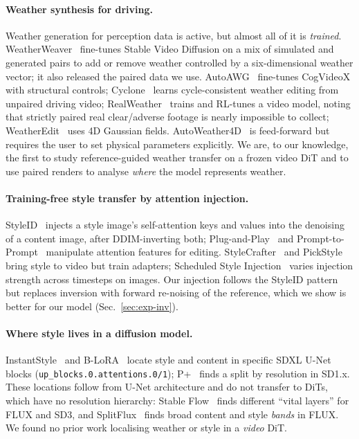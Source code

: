 \documentclass[11pt,a4paper]{article}
\begin{document}
\paragraph{Weather synthesis for driving.}
Weather generation for perception data is active, but almost all of it is \emph{trained}.
WeatherWeaver~\cite{weatherweaver} fine-tunes Stable Video Diffusion on a mix of simulated and generated pairs to add or remove weather controlled by a six-dimensional weather vector; it also released the paired data we use.
AutoAWG~\cite{autoawg} fine-tunes CogVideoX with structural controls; Cyclone~\cite{cyclone} learns cycle-consistent weather editing from unpaired driving video; RealWeather~\cite{realweather} trains and RL-tunes a video model, noting that strictly paired real clear/adverse footage is nearly impossible to collect; WeatherEdit~\cite{weatheredit} uses 4D Gaussian fields.
AutoWeather4D~\cite{autoweather4d} is feed-forward but requires the user to set physical parameters explicitly.
We are, to our knowledge, the first to study reference-guided weather transfer on a frozen video DiT and to use paired renders to analyse \emph{where} the model represents weather.

\paragraph{Training-free style transfer by attention injection.}
StyleID~\cite{styleid} injects a style image's self-attention keys and values into the denoising of a content image, after DDIM-inverting both; Plug-and-Play~\cite{pnp} and Prompt-to-Prompt~\cite{p2p} manipulate attention features for editing.
StyleCrafter~\cite{stylecrafter} and PickStyle~\cite{pickstyle} bring style to video but train adapters; Scheduled Style Injection~\cite{scheduledstyle} varies injection strength across timesteps on images.
Our injection follows the StyleID pattern but replaces inversion with forward re-noising of the reference, which we show is better for our model (Sec.~\ref{sec:exp-inv}).

\paragraph{Where style lives in a diffusion model.}
InstantStyle~\cite{instantstyle} and B-LoRA~\cite{blora} locate style and content in specific SDXL U-Net blocks (\texttt{up\_blocks.0.attentions.0/1}); P+~\cite{pplus} finds a split by resolution in SD1.x.
These locations follow from U-Net architecture and do not transfer to DiTs, which have no resolution hierarchy: Stable Flow~\cite{stableflow} finds different ``vital layers'' for FLUX and SD3, and SplitFlux~\cite{splitflux} finds broad content and style \emph{bands} in FLUX.
We found no prior work localising weather or style in a \emph{video} DiT.
\end{document}
